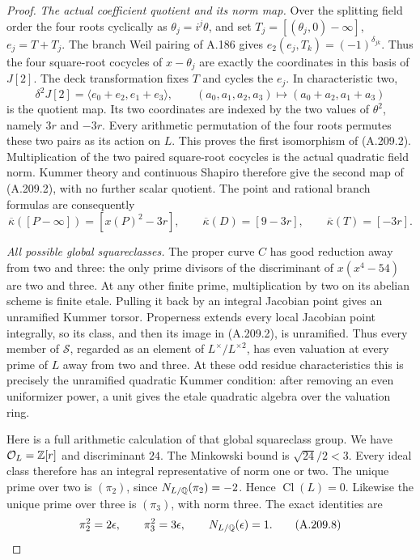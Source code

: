 \begin{proof}
\emph{The actual coefficient quotient and its norm map.}
Over the splitting field order the four roots cyclically as
\(\theta_j=i^j\theta\), and set
\(T_j=[(\theta_j,0)-\infty]\), \(e_j=T+T_j\).
The branch Weil pairing of A.186 gives
\(e_2(e_j,T_k)=(-1)^{\delta_{jk}}\).
Thus the four square-root cocycles of \(x-\theta_j\)
are exactly the coordinates in this basis of \(J[2]\).
The deck transformation fixes \(T\) and cycles the
\(e_j\).  In characteristic two,
\[
 \delta^2J[2]=\langle e_0+e_2,e_1+e_3\rangle,
 \qquad
 (a_0,a_1,a_2,a_3)\longmapsto(a_0+a_2,a_1+a_3)
\tag{A.209.6}
\]
is the quotient map.  Its two coordinates are indexed
by the two values of \(\theta^2\), namely \(3r\)
and \(-3r\).  Every arithmetic permutation of the
four roots permutes these two pairs as its action on
\(L\).  This proves the first isomorphism of (A.209.2).
Multiplication of the two paired square-root cocycles
is the actual quadratic field norm.  Kummer theory and
continuous Shapiro therefore give the second map of
(A.209.2), with no further scalar quotient.
The point and rational branch formulas are consequently
\[
 \overline\kappa([P-\infty])=[x(P)^2-3r],
 \qquad
 \overline\kappa(D)=[9-3r],\qquad
 \overline\kappa(T)=[-3r].
\tag{A.209.7}
\]

\emph{All possible global squareclasses.}
The proper curve \(C\) has good reduction away from
two and three: the only prime divisors of the discriminant
of \(x(x^4-54)\) are two and three.  At any other finite
prime, multiplication by two on its abelian scheme is
finite etale.  Pulling it back by an integral Jacobian
point gives an unramified Kummer torsor.  Properness
extends every local Jacobian point integrally, so its
class, and then its image in (A.209.2), is unramified.
Thus every member of \(\mathcal S\), regarded as an
element of \(L^\times/L^{\times2}\), has even valuation
at every prime of \(L\) away from two and three.
At these odd residue characteristics this is precisely
the unramified quadratic Kummer condition: after removing
an even uniformizer power, a unit gives the etale quadratic
algebra over the valuation ring.

Here is a full arithmetic calculation of that global
squareclass group.  We have \(\mathcal O_L=\mathbb Z[r]\)
and discriminant \(24\).  The Minkowski bound
\cite[Theorem 4.3, printed p.~70]{AgentMilneANT} is
\(\sqrt{24}/2<3\).  Every ideal class therefore has
an integral representative of norm one or two.
The unique prime over two is \((\pi_2)\), since
\(N_{L/\mathbb Q}(\pi_2)=-2\).  Hence \(\operatorname{Cl}(L)=0\).
Likewise the unique prime over three is \((\pi_3)\),
with norm three.  The exact identities are
\[
 \pi_2^2=2\epsilon,\qquad
 \pi_3^2=3\epsilon,\qquad N_{L/\mathbb Q}(\epsilon)=1.
\tag{A.209.8}
\]


\end{proof}
